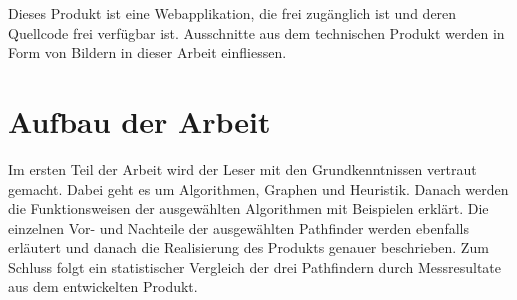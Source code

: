 Dieses Produkt ist eine Webapplikation\cite{bma}, die frei zugänglich ist
und deren Quellcode\cite{bmaonline} frei verfügbar ist. Ausschnitte aus dem technischen
Produkt werden in Form von Bildern in dieser Arbeit einfliessen.

\section{Aufbau der Arbeit}

Im ersten Teil der Arbeit wird der Leser mit den Grundkenntnissen
vertraut gemacht. Dabei geht es um Algorithmen, Graphen und Heuristik.
Danach werden die Funktionsweisen der ausgewählten Algorithmen mit Beispielen erklärt. 
Die einzelnen Vor- und Nachteile der
ausgewählten Pathfinder werden ebenfalls erläutert und danach die
Realisierung des Produkts genauer beschrieben. Zum Schluss folgt ein
statistischer Vergleich der drei Pathfindern durch Messresultate aus dem
entwickelten Produkt.
